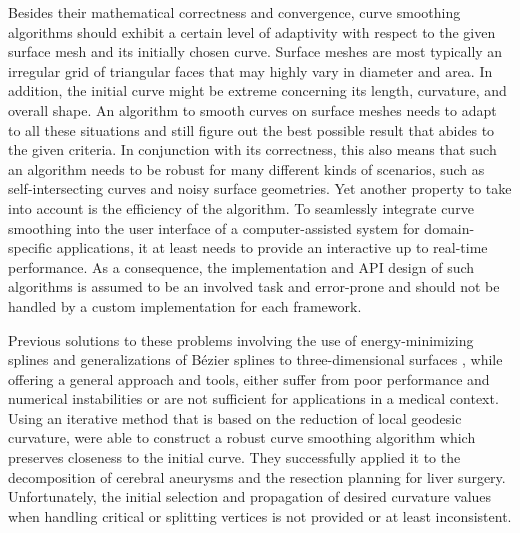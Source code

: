 \documentclass{stdlocal}
\begin{document}

Besides their mathematical correctness and convergence, curve smoothing algorithms should exhibit a certain level of adaptivity with respect to the given surface mesh and its initially chosen curve.
Surface meshes are most typically an irregular grid of triangular faces that may highly vary in diameter and area.
In addition, the initial curve might be extreme concerning its length, curvature, and overall shape.
An algorithm to smooth curves on surface meshes needs to adapt to all these situations and still figure out the best possible result that abides to the given criteria.
In conjunction with its correctness, this also means that such an algorithm needs to be robust for many different kinds of scenarios, such as self-intersecting curves and noisy surface geometries.
Yet another property to take into account is the efficiency of the algorithm.
To seamlessly integrate curve smoothing into the user interface of a computer-assisted system for domain-specific applications, it at least needs to provide an interactive up to real-time performance.
As a consequence, the implementation and API design of such algorithms is assumed to be an involved task and error-prone and should not be handled by a custom implementation for each framework.
\autocite{lawonn2014}

Previous solutions to these problems involving the use of energy-minimizing splines \autocite{hofer2004} and generalizations of Bézier splines to three-dimensional surfaces \autocite{martinez2007,mancinelli2022}, while offering a general approach and tools, either suffer from poor performance and numerical instabilities or are not sufficient for applications in a medical context.
Using an iterative method that is based on the reduction of local geodesic curvature, \textcite{lawonn2014} were able to construct a robust curve smoothing algorithm which preserves closeness to the initial curve.
They successfully applied it to the decomposition of cerebral aneurysms and the resection planning for liver surgery.
Unfortunately, the initial selection and propagation of desired curvature values when handling critical or splitting vertices is not provided or at least inconsistent.
\end{document}
